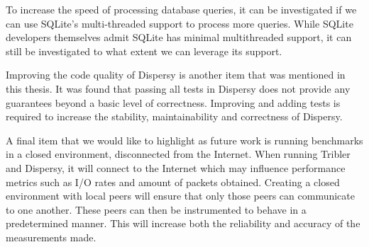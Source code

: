 To increase the speed of processing database queries, it can be investigated if we can use SQLite's multi-threaded support to process more queries.
While SQLite developers themselves admit SQLite has minimal multithreaded support, it can still be investigated to what extent we can leverage its support.

Improving the code quality of Dispersy is another item that was mentioned in this thesis.
It was found that passing all tests in Dispersy does not provide any guarantees beyond a basic level of correctness.
Improving and adding tests is required to increase the stability, maintainability and correctness of Dispersy.

A final item that we would like to highlight as future work is running benchmarks in a closed environment, disconnected from the Internet.
When running Tribler and Dispersy, it will connect to the Internet which may influence performance metrics such as I/O rates and amount of packets obtained.
Creating a closed environment with local peers will ensure that only those peers can communicate to one another.
These peers can then be instrumented to behave in a predetermined manner.
This will increase both the reliability and accuracy of the measurements made.
